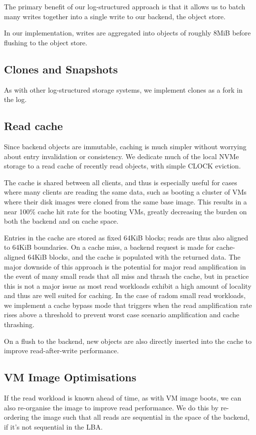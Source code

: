 The primary benefit of our log-structured approach is that it allows us to batch
many writes together into a single write to our backend, the object store.

In our implementation, writes are aggregated into objects of roughly 8MiB before
flushing to the object store.


\subsection{Clones and Snapshots}

As with other log-structured storage systems, we implement clones as a fork in
the log. 

\subsection{Read cache}

Since backend objects are immutable, caching is much simpler without worrying
about entry invalidation or consistency. We dedicate much of the local NVMe
storage to a read cache of recently read objects, with simple CLOCK eviction.

The cache is shared between all clients, and thus is especially useful for cases
where many clients are reading the same data, such as booting a cluster of VMs
where their disk images were cloned from the same base image. This results in a
near 100\% cache hit rate for the booting VMs, greatly decreasing the burden on
both the backend and on cache space.

Entries in the cache are stored as fixed 64KiB blocks; reads are thus also
aligned to 64KiB boundaries. On a cache miss, a backend request is made for
cache-aligned 64KiB blocks, and the cache is populated with the returned data.
The major downside of this approach is the potential for major read
amplification in the event of many small reads that all miss and thrash the
cache, but in practice this is not a major issue as most read workloads exhibit
a high amount of locality and thus are well suited for caching. In the case
of radom small read workloads, we implement a cache bypass mode that triggers
when the read amplification rate rises above a threshold to prevent worst case
scenario amplification and cache thrashing.

On a flush to the backend, new objects are also directly inserted into the cache
to improve read-after-write performance.

\subsection{VM Image Optimisations}

If the read workload is known ahead of time, as with VM image boots, we can also
re-organise the image to improve read performance. We do this by re-ordering the
image such that all reads are sequential in the space of the backend, if it's
not sequential in the LBA.


